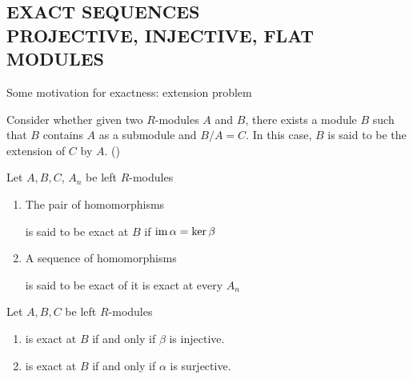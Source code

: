 \subsection{EXACT SEQUENCES \\ PROJECTIVE, INJECTIVE, FLAT MODULES}

Some motivation for exactness: extension problem

Consider whether given two $R$-modules $A$ and $B$, there exists a module $B$ such that $B$ contains $A$ as a submodule and $B / A = C$. In this case, $B$ is said to be the extension of $C$ by $A$. ()

\begin{definition}
	Let $A, B, C$, $A_n$ be left $R$-modules 
	\begin{enumerate}
		\item The pair of homomorphisms 
		\begin{center}
		\end{center}
		is said to be exact at $B$ if $\operatorname{im} \alpha = \ker \beta$
		
		\item A sequence of homomorphisms
		\begin{center}
		\end{center}
		
		is said to be exact of it is exact at every $A_n$
	\end{enumerate}
\end{definition}

\begin{remark}
	Let $A, B, C$ be left $R$-modules
	\begin{enumerate}
		\item {} is exact at $B$ if and only if $\beta$ is injective.
		\item {} is exact at $B$ if and only if $\alpha$ is surjective.
	\end{enumerate}
\end{remark}

